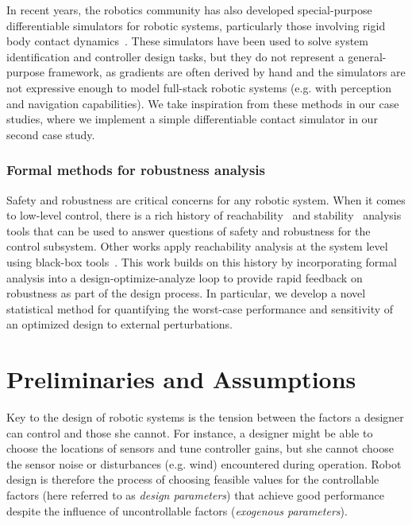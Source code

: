 In recent years, the robotics community has also developed special-purpose differentiable simulators for robotic systems, particularly those involving rigid body contact dynamics~\cite{heiden2021neuralsim,belubute_peres_lcp_physics,drake,suh2021_bundled_gradients}. These simulators have been used to solve system identification and controller design tasks, but they do not represent a general-purpose framework, as gradients are often derived by hand and the simulators are not expressive enough to model full-stack robotic systems (e.g. with perception and navigation capabilities). We take inspiration from these methods in our case studies, where we implement a simple differentiable contact simulator in our second case study.

\subsubsection{Formal methods for robustness analysis}

Safety and robustness are critical concerns for any robotic system. When it comes to low-level control, there is a rich history of reachability~\cite{althoff_reachability_review} and stability~\cite{changNeuralLyapunovControl2019,dawsonSafeNonlinearControl2022} analysis tools that can be used to answer questions of safety and robustness for the control subsystem.
Other works apply reachability analysis at the system level using black-box tools~\cite{fan_dryvr}. This work builds on this history by incorporating formal analysis into a design-optimize-analyze loop to provide rapid feedback on robustness as part of the design process. In particular, we develop a novel statistical method for quantifying the worst-case performance and sensitivity of an optimized design to external perturbations.

\section{Preliminaries and Assumptions}\label{ch:rss:prelim}

Key to the design of robotic systems is the tension between the factors a designer can control and those she cannot. For instance, a designer might be able to choose the locations of sensors and tune controller gains, but she cannot choose the sensor noise or disturbances (e.g. wind) encountered during operation.
Robot design is therefore the process of choosing feasible values for the controllable factors (here referred to as \textit{design parameters}) that achieve good performance despite the influence of uncontrollable factors (\textit{exogenous parameters}).

